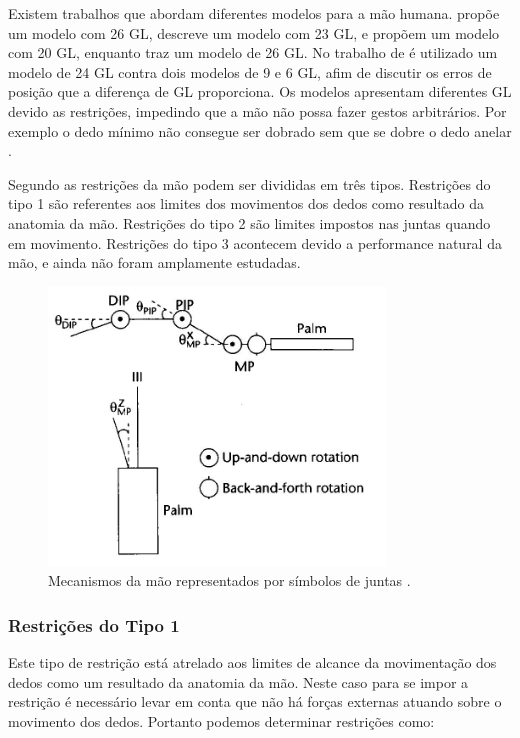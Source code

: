 Existem trabalhos que abordam diferentes modelos para a mão humana.  \cite{bray2005stochastic} propõe um modelo com 26 GL, \cite{kuch1994human} descreve um modelo com 23 GL, \cite{chalfoun2004muscle} e \cite{renault2001dynamic} propõem um modelo com 20 GL, enquanto \cite{du20073d} traz um modelo de 26 GL. No trabalho de \cite{cobos2008efficient} é utilizado um modelo de 24 GL contra dois modelos de 9 e 6 GL, afim de discutir os erros de posição que a diferença de GL proporciona. Os modelos apresentam diferentes GL devido as restrições, impedindo que a mão não possa fazer gestos arbitrários. Por exemplo o dedo mínimo não consegue ser dobrado sem que se dobre o dedo anelar \cite{lin2000modeling}.

Segundo \cite{lin2000modeling} as restrições da mão podem ser divididas em três tipos. Restrições do tipo 1 são referentes aos limites dos movimentos dos dedos como resultado da anatomia da mão. Restrições do tipo 2 são limites impostos nas juntas quando em movimento. Restrições do tipo 3 acontecem devido a performance natural da mão, e ainda não foram amplamente estudadas.

\begin{figure}[H]
\centering
\includegraphics[width = 0.8\textwidth]{img/Lee_Dedo.JPG}
\caption[As juntas de um dedo representadas com seus ângulos]{Mecanismos da mão representados por símbolos de juntas \cite{lee1995model}.}
\label{Lee_Dedo}
\end{figure}

\subsubsection{Restrições do Tipo 1}\label{Tipo 1}
Este tipo de restrição está atrelado aos limites de alcance da movimentação dos dedos como um resultado da anatomia da mão. Neste caso para se impor a restrição é necessário levar em conta que não há forças externas atuando sobre o movimento dos dedos. Portanto podemos determinar restrições como:

